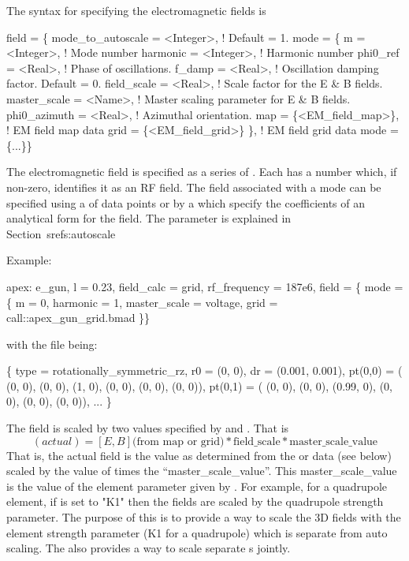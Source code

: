 The syntax for specifying the electromagnetic fields is
\label{v:field}
\begin{example}
  field = \{
    mode_to_autoscale = <Integer>, ! Default = 1.
    mode = \{
      m             = <Integer>,   ! Mode number
      harmonic      = <Integer>,   ! Harmonic number 
      phi0_ref      = <Real>,      ! Phase of oscillations.
      f_damp        = <Real>,      ! Oscillation damping factor. Default = 0.
      field_scale   = <Real>,      ! Scale factor for the E & B fields.
      master_scale  = <Name>,      ! Master scaling parameter for E & B fields.
      phi0_azimuth  = <Real>,      ! Azimuthal orientation.
      map           = \{<EM_field_map>\},    ! EM field map data
      grid          = \{<EM_field_grid>\} \}, ! EM field grid data
    mode = \{...\}\}
\end{example}
The electromagnetic field is specified as a series of . Each
 has a  number which, if non-zero, identifies it
as an RF field. The field associated with a mode can be specified
using a  of data points or by a  which specify the
coefficients of an analytical form for the field. The
 parameter is explained in
Section~sref{s:autoscale}

Example:
\begin{example}
  apex: e_gun, l = 0.23, field_calc = grid, rf_frequency = 187e6, 
    field = \{ mode = \{
      m = 0, harmonic = 1,
      master_scale = voltage,
      grid = call::apex_gun_grid.bmad \}\}
\end{example}
with the file  being:
\begin{example}
  \{
    type = rotationally_symmetric_rz,
    r0 = (0, 0),
    dr = (0.001, 0.001),
    pt(0,0) = ( (0, 0), (0, 0), (1, 0),  (0, 0), (0, 0), (0, 0)),
    pt(0,1) = ( (0, 0), (0, 0), (0.99, 0),  (0, 0), (0, 0), (0, 0)),
    ... \}
\end{example}

The field is scaled by two values specified by  and
. That is
\begin{equation}
  [E, B] (actual) = [E, B] \text{(from map or grid)} * 
  \text{field_scale} * \text{master_scale_value}
\end{equation}
That is, the actual field is the value as determined from the 
or  data (see below) scaled by the value of 
times the ``master_scale_value''. This master_scale_value is the value
of the element parameter given by . For example, for
a quadrupole element, if  is set to "K1" then the
fields are scaled by the quadrupole strength parameter. The purpose of
this  is to provide a way to scale the 3D fields with
the element strength parameter (K1 for a quadrupole) which is separate
from auto scaling. The  also provides a way to scale
separate s jointly.

